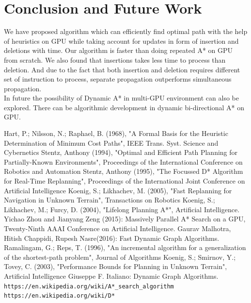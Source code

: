 \documentclass[a4paper]{article}
\begin{document}
\section{Conclusion and Future Work}
We have proposed algorithm which can efficiently find optimal path with the help of heuristics on GPU while taking account for updates in form of insertion and deletions with time. Our algorithm is faster than doing repeated A* on GPU from scratch. We also found that insertions takes less time to process than deletion. And due to the fact that both insertion and deletion requires different set of instruction to process, separate propagation outperforms simultaneous propagation.\\
In future the possibility of Dynamic A* in multi-GPU environment can also be explored. There can be algorithmic development in dynamic bi-directional A* on GPU. \newpage
\begin{thebibliography}{} 
     Hart, P.; Nilsson, N.; Raphael, B. (1968), "A Formal Basis for the Heuristic Determination of Minimum Cost Paths", IEEE Trans. Syst. Science and Cybernetics
    Stentz, Anthony (1994), "Optimal and Efficient Path Planning for Partially-Known Environments", Proceedings of the International Conference on Robotics and Automation
    Stentz, Anthony (1995), "The Focussed D* Algorithm for Real-Time Replanning", Proceedings of the International Joint Conference on Artificial Intelligence
    Koenig, S.; Likhachev, M. (2005), "Fast Replanning for Navigation in Unknown Terrain", Transactions on Robotics
    Koenig, S.; Likhachev, M.; Furcy, D. (2004), "Lifelong Planning A*", Artificial Intelligence.
    Yichao Zhou and Jianyang Zeng (2015): Massively Parallel A* Search on a GPU, Twenty-Ninth AAAI Conference on Artificial Intelligence.
    Gaurav Malhotra, Hitish Chappidi, Rupesh Nasre(2016): Fast Dynamic Graph Algorithms.
     Ramalingam, G.; Reps, T. (1996), "An incremental algorithm for a generalization of the shortest-path problem", Journal of Algorithms
    Koenig, S.; Smirnov, Y.; Tovey, C. (2003), "Performance Bounds for Planning in Unknown Terrain", Artificial Intelligence
    Giuseppe F. Italiano: Dynamic Graph Algorithms.
    \texttt{https://en.wikipedia.org/wiki/A*\_search\_algorithm}
    \texttt{https://en.wikipedia.org/wiki/D*}
    
\end{thebibliography}
\end{document}
